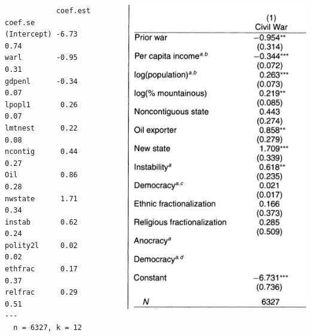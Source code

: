 \documentclass[handout]{beamer}
\begin{document}
\begin{frame}[fragile]
\begin{columns}[T] %
\begin{column}{.48\textwidth}
\begin{verbatim}
            coef.est coef.se
(Intercept) -6.73     0.74  
warl        -0.95     0.31  
gdpenl      -0.34     0.07  
lpopl1       0.26     0.07  
lmtnest      0.22     0.08  
ncontig      0.44     0.27  
Oil          0.86     0.28  
nwstate      1.71     0.34  
instab       0.62     0.24  
polity2l     0.02     0.02  
ethfrac      0.17     0.37  
relfrac      0.29     0.51  
---
  n = 6327, k = 12
\end{verbatim}

\end{column}%
\hfill%
\begin{column}{.48\textwidth}
\includegraphics[scale = .38]{figs/fearon-laitin-coefs.png}
\end{column}%
\end{columns}
\end{frame}

\end{document}
